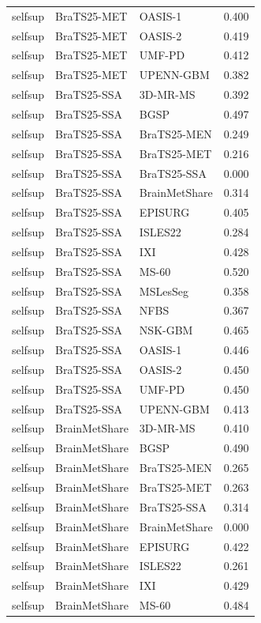 \begin{tabular}{lllr}
selfsup & BraTS25-MET & OASIS-1 & 0.400 \\
selfsup & BraTS25-MET & OASIS-2 & 0.419 \\
selfsup & BraTS25-MET & UMF-PD & 0.412 \\
selfsup & BraTS25-MET & UPENN-GBM & 0.382 \\
selfsup & BraTS25-SSA & 3D-MR-MS & 0.392 \\
selfsup & BraTS25-SSA & BGSP & 0.497 \\
selfsup & BraTS25-SSA & BraTS25-MEN & 0.249 \\
selfsup & BraTS25-SSA & BraTS25-MET & 0.216 \\
selfsup & BraTS25-SSA & BraTS25-SSA & 0.000 \\
selfsup & BraTS25-SSA & BrainMetShare & 0.314 \\
selfsup & BraTS25-SSA & EPISURG & 0.405 \\
selfsup & BraTS25-SSA & ISLES22 & 0.284 \\
selfsup & BraTS25-SSA & IXI & 0.428 \\
selfsup & BraTS25-SSA & MS-60 & 0.520 \\
selfsup & BraTS25-SSA & MSLesSeg & 0.358 \\
selfsup & BraTS25-SSA & NFBS & 0.367 \\
selfsup & BraTS25-SSA & NSK-GBM & 0.465 \\
selfsup & BraTS25-SSA & OASIS-1 & 0.446 \\
selfsup & BraTS25-SSA & OASIS-2 & 0.450 \\
selfsup & BraTS25-SSA & UMF-PD & 0.450 \\
selfsup & BraTS25-SSA & UPENN-GBM & 0.413 \\
selfsup & BrainMetShare & 3D-MR-MS & 0.410 \\
selfsup & BrainMetShare & BGSP & 0.490 \\
selfsup & BrainMetShare & BraTS25-MEN & 0.265 \\
selfsup & BrainMetShare & BraTS25-MET & 0.263 \\
selfsup & BrainMetShare & BraTS25-SSA & 0.314 \\
selfsup & BrainMetShare & BrainMetShare & 0.000 \\
selfsup & BrainMetShare & EPISURG & 0.422 \\
selfsup & BrainMetShare & ISLES22 & 0.261 \\
selfsup & BrainMetShare & IXI & 0.429 \\
selfsup & BrainMetShare & MS-60 & 0.484 \\

\end{tabular}
